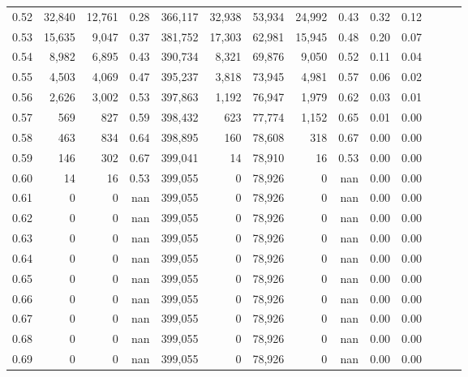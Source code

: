 \begin{tabular}{rrrrrrrrrrrrrr}
0.52 &  32,840 &  12,761 &  0.28 &  366,117 &   32,938 &  53,934 &  24,992 &  0.43 &  0.32 &      0.12 \\
0.53 &  15,635 &   9,047 &  0.37 &  381,752 &   17,303 &  62,981 &  15,945 &  0.48 &  0.20 &      0.07 \\
0.54 &   8,982 &   6,895 &  0.43 &  390,734 &    8,321 &  69,876 &   9,050 &  0.52 &  0.11 &      0.04 \\
0.55 &   4,503 &   4,069 &  0.47 &  395,237 &    3,818 &  73,945 &   4,981 &  0.57 &  0.06 &      0.02 \\
0.56 &   2,626 &   3,002 &  0.53 &  397,863 &    1,192 &  76,947 &   1,979 &  0.62 &  0.03 &      0.01 \\
0.57 &     569 &     827 &  0.59 &  398,432 &      623 &  77,774 &   1,152 &  0.65 &  0.01 &      0.00 \\
0.58 &     463 &     834 &  0.64 &  398,895 &      160 &  78,608 &     318 &  0.67 &  0.00 &      0.00 \\
0.59 &     146 &     302 &  0.67 &  399,041 &       14 &  78,910 &      16 &  0.53 &  0.00 &      0.00 \\
0.60 &      14 &      16 &  0.53 &  399,055 &        0 &  78,926 &       0 &   nan &  0.00 &      0.00 \\
0.61 &       0 &       0 &   nan &  399,055 &        0 &  78,926 &       0 &   nan &  0.00 &      0.00 \\
0.62 &       0 &       0 &   nan &  399,055 &        0 &  78,926 &       0 &   nan &  0.00 &      0.00 \\
0.63 &       0 &       0 &   nan &  399,055 &        0 &  78,926 &       0 &   nan &  0.00 &      0.00 \\
0.64 &       0 &       0 &   nan &  399,055 &        0 &  78,926 &       0 &   nan &  0.00 &      0.00 \\
0.65 &       0 &       0 &   nan &  399,055 &        0 &  78,926 &       0 &   nan &  0.00 &      0.00 \\
0.66 &       0 &       0 &   nan &  399,055 &        0 &  78,926 &       0 &   nan &  0.00 &      0.00 \\
0.67 &       0 &       0 &   nan &  399,055 &        0 &  78,926 &       0 &   nan &  0.00 &      0.00 \\
0.68 &       0 &       0 &   nan &  399,055 &        0 &  78,926 &       0 &   nan &  0.00 &      0.00 \\
0.69 &       0 &       0 &   nan &  399,055 &        0 &  78,926 &       0 &   nan &  0.00 &      0.00 \\

\end{tabular}

